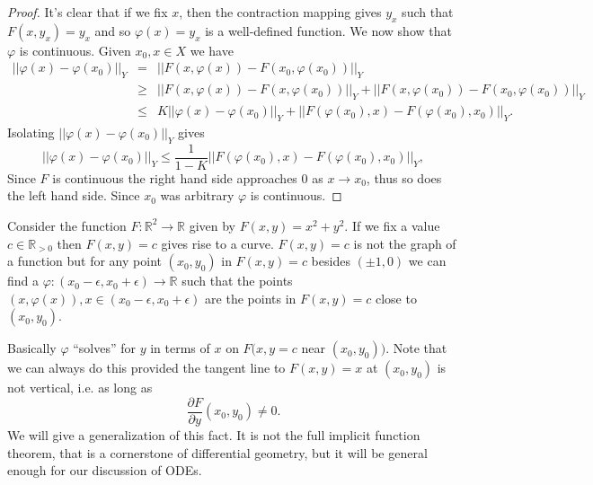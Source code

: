 \documentclass[10pt]{article}
\theoremstyle{definition}
\theoremstyle{remark}
\newcommand{\bbR}{\mathbb{R}}
\begin{document}
\begin{proof}
  It's clear that if we fix $x$, then the contraction mapping gives $y_x$ such that $F(x,y_x)=y_x$ and so $\varphi(x)=y_x$ is a well-defined function. We now show that $\varphi$ is continuous. Given $x_0,x \in X$ we have
  \begin{eqnarray*}
    ||\varphi(x)-\varphi(x_0)||_Y
                               & = &||F(x,\varphi(x))-F(x_0,\varphi(x_0))||_Y\\
                               & \geq & ||F(x,\varphi(x)) - F(x,\varphi(x_0))||_Y+||F(x,\varphi(x_0))-F(x_0,\varphi(x_0))||_Y\\
                               & \leq & K||\varphi(x)-\varphi(x_0)||_Y+ ||F(\varphi(x_0),x)-F(\varphi(x_0),x_0)||_Y.
  \end{eqnarray*}
  Isolating $||\varphi(x)-\varphi(x_0)||_Y$ gives
  \[
    ||\varphi(x)-\varphi(x_0)||_Y\leq \frac{1}{1-K}||F(\varphi(x_0),x)-F(\varphi(x_0),x_0)||_Y,
  \]
  Since $F$ is continuous the right hand side approaches 0 as $x\to x_0$, thus so does the left hand side. Since $x_0$ was arbitrary $\varphi$ is continuous.
\end{proof}

  
  Consider the function $F:\bbR^2 \to \bbR$ given by $F(x,y) = x^2+y^2$. If we fix a value $c \in \bbR_{>0}$ then $F(x,y)=c$ gives rise to a curve. $F(x,y)=c$ is not the graph of a function but for any point $(x_0,y_0)$ in $F(x,y)=c$ besides $(\pm 1,0)$ we can find a $\varphi:(x_0-\epsilon,x_0+\epsilon) \to \bbR$ such that the points $(x,\varphi(x)), x \in (x_0-\epsilon,x_0+\epsilon)$  are the points in $F(x,y)=c$ close to $(x_0,y_0)$.

Basically $\varphi$ ``solves'' for $y$ in terms of $x$ on $F(x,y=c$ near $(x_0,y_0))$. Note that we can always do this provided the tangent line to $F(x,y)=x$ at $(x_0,y_0)$ is not vertical, i.e. as long as\[
\frac{\partial F}{\partial y}(x_0,y_0) \neq 0.
\]
We will give a generalization of this fact. It is not the full implicit function theorem, that is a cornerstone of differential geometry, but it will be general enough for our discussion of ODEs.
\end{document}
